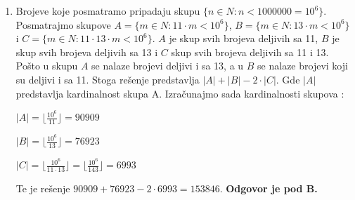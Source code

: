 \documentclass[a4paper,12pt]{report}
\begin{document}
\begin{enumerate}[1.]
\item Brojeve koje posmatramo pripadaju skupu $ \{n\in N : n < 1 000 000 = 10^{6}\} $. Posmatrajmo skupove $A = \{ m \in N : 11 \cdot m < 10^{6}\}$, $B = \{ m \in N : 13 \cdot m < 10^{6}\}$ i $C = \{ m \in N : 11 \cdot 13 \cdot m < 10^{6}\}$. $A$ je skup svih brojeva deljivih sa 11, $B$ je skup svih brojeva deljivih sa 13 i $C$ skup svih brojeva deljivih sa 11 i 13. Po\v{s}to u skupu $A$ se nalaze brojevi deljivi i sa 13, a u $B$ se nalaze brojevi koji su deljivi i sa 11. Stoga re\v{s}enje predstavlja $\lvert A \rvert + \lvert B \rvert  - 2 \cdot \lvert C \rvert $. Gde $ \lvert A \rvert $ predstavlja kardinalnost skupa A. Izra\v{c}unajmo sada kardinalnosti skupova :
\par $ \lvert A \rvert = \lfloor \frac{10^{6}}{11}\rfloor   = 90909$  
\par  $ \lvert B \rvert = \lfloor \frac{10^{6}}{13}\rfloor   = 76923$
\par  $ \lvert C \rvert = \lfloor \frac{10^{6}}{11 \cdot 13}\rfloor = \lfloor \frac{10^{6}}{143}\rfloor  = 6993$  
\par Te je re\v{s}enje $ 90909 + 76923 - 2 \cdot 6993  = 153846$. \textbf{Odgovor je pod B.}


\end{enumerate}
\end{document}
